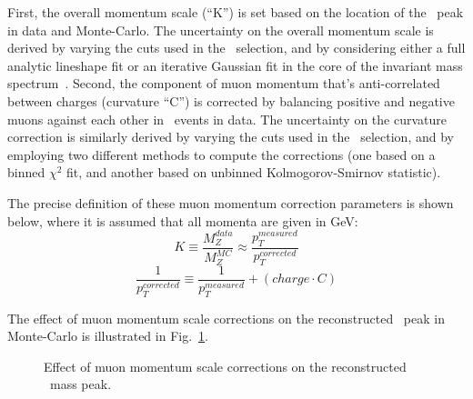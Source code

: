 First, the overall momentum scale (``K'') is set based on the location of the \Zmm\ peak in data and Monte-Carlo.
The uncertainty on the overall momentum scale is derived by varying the cuts used in the \Zmm\ selection, 
and by considering either a full analytic lineshape fit or an iterative Gaussian fit in the core of the invariant mass spectrum~\cite{Kapliy:1358186}.
Second, the component of muon momentum that's anti-correlated between charges (curvature ``C'') is corrected by balancing
positive and negative muons against each other in \Zmm\ events in data. The uncertainty on the curvature correction is
similarly derived by varying the cuts used in the \Zmm\ selection, and by employing two different methods to compute
the corrections (one based on a binned $\chi^{2}$ fit, and another based on unbinned Kolmogorov-Smirnov statistic).

The precise definition of these muon momentum correction parameters is shown below, where it is assumed that all momenta are given in GeV:
$$K \equiv \frac{M_{Z}^{data}}{M_{Z}^{MC}} \approx \frac{p_{T}^{measured}}{p_{T}^{corrected}}$$
$$\frac{1}{p_{T}^{corrected}} \equiv \frac{1}{p_{T}^{measured}} + (charge \cdot C)$$

The effect of muon momentum scale corrections on the reconstructed \Zmm\ peak in Monte-Carlo is illustrated in Fig.~\ref{fig:perf:mcpcorr}.

\begin{figure}[phtb]
  \begin{center}
 \caption{ Effect of muon momentum scale corrections on the reconstructed \Zmm\ mass peak.}
 \label{fig:perf:mcpcorr}
 \end{center}
\end{figure}

